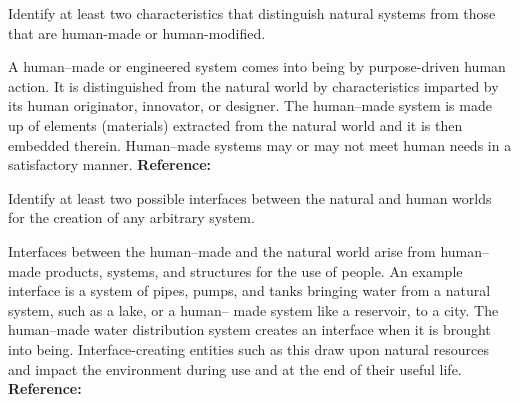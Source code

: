 \begin{exercises}
    \begin{exercise}
    \label{sea-2-1}
        Identify at least two characteristics that distinguish natural systems from those that are human-made or human-modified.
    \end{exercise}
    \begin{solution}
        A human–made or engineered system comes into being by purpose-driven human action. It is distinguished from the natural world by characteristics imparted by its human originator, innovator, or designer. The human–made system is made up of elements (materials) extracted from the natural world and it is then embedded therein. Human–made systems may or may not meet human needs in a satisfactory manner. \textbf{Reference:}
    \end{solution}
    
    \begin{exercise}
    \label{sea-2-2}
        Identify at least two possible interfaces between the natural and human worlds for the creation of any arbitrary system.
    \end{exercise}
    \begin{solution}
        Interfaces between the human–made and the natural world arise from human–made products, systems, and structures for the use of people. An example interface is a system of pipes, pumps, and tanks bringing water from a natural system, such as a lake, or a human– made system like a reservoir, to a city. The human–made water distribution system creates an interface when it is brought into being. Interface-creating entities such as this draw upon natural resources and impact the environment during use and at the end of their useful life. \textbf{Reference:}
    \end{solution}
    

\end{exercises}

